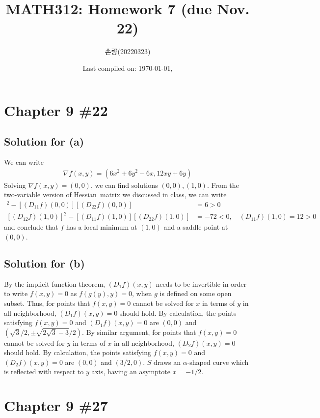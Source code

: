 \documentclass{scrartcl}
\title{MATH312: Homework 7 (due Nov. 22)}
\author{손량(20220323)}
\date{Last compiled on: \today, \currenttime}
\begin{document}
\maketitle

\section{Chapter 9 \#22}
\subsection{Solution for (a)}
We can write
\begin{align*}
  \nabla f(x, y)
  = (6x^2 + 6y^2 - 6x, 12xy + 6y)
\end{align*}
Solving \(\nabla f(x, y) = (0, 0)\), we can find solutions \((0, 0), (1, 0)\).
From the two-variable version of Hessian~matrix we discussed in class, we can
write
\begin{align*}
  [(D_{12} f) (0, 0)]^2 - [(D_{11} f) (0, 0)] [(D_{22} f) (0, 0)]
  &= 6
  > 0 \\
  [(D_{12} f) (1, 0)]^2 - [(D_{11} f) (1, 0)] [(D_{22} f) (1, 0)]
  &= -72 < 0, \quad
  (D_{11} f) (1, 0)
  = 12 > 0
\end{align*}
and conclude that \(f\) has a local minimum at \((1, 0)\) and a saddle point at
\((0, 0)\).

\subsection{Solution for (b)}
By the implicit function theorem, \((D_1 f) (x, y)\) needs to be invertible in
order to write \(f(x, y) = 0\) as \(f(g(y), y) = 0\), when \(g\) is defined on
some open subset. Thus, for points that \(f(x, y) = 0\) cannot be solved for
\(x\) in terms of \(y\) in all neighborhood, \((D_1 f) (x, y) = 0\) should
hold. By calculation, the points satisfying \(f(x, y) = 0\) and \((D_1 f) (x,
y) = 0\) are \((0, 0)\) and \((\sqrt{3} / 2, \pm \sqrt{2 \sqrt{3} - 3} / 2)\).
By similar argument, for points that \(f(x, y) = 0\) cannot be solved for \(y\)
in terms of \(x\) in all neighborhood, \((D_2 f) (x, y) = 0\) should hold. By
calculation, the points satisfying \(f(x, y) = 0\) and \((D_2 f) (x, y) = 0\)
are \((0, 0)\) and \((3 / 2, 0)\). \(S\) draws an \(\alpha\)-shaped curve which
is reflected with respect to \(y\) axis, having an asymptote \(x = -1/2\).

\section{Chapter 9 \#27}
\end{document}
